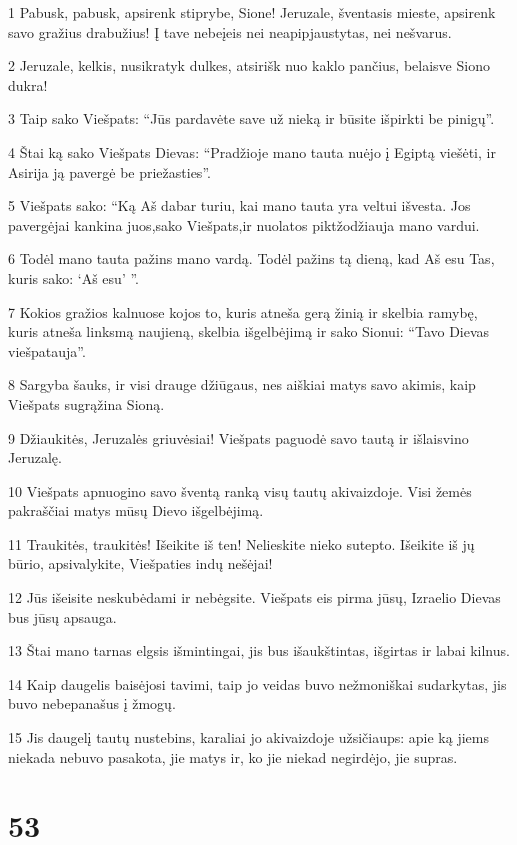 \par 1 Pabusk, pabusk, apsirenk stiprybe, Sione! Jeruzale, šventasis mieste, apsirenk savo gražius drabužius! Į tave nebeįeis nei neapipjaustytas, nei nešvarus. 
\par 2 Jeruzale, kelkis, nusikratyk dulkes, atsirišk nuo kaklo pančius, belaisve Siono dukra! 
\par 3 Taip sako Viešpats: “Jūs pardavėte save už nieką ir būsite išpirkti be pinigų”. 
\par 4 Štai ką sako Viešpats Dievas: “Pradžioje mano tauta nuėjo į Egiptą viešėti, ir Asirija ją pavergė be priežasties”. 
\par 5 Viešpats sako: “Ką Aš dabar turiu, kai mano tauta yra veltui išvesta. Jos pavergėjai kankina juos,­sako Viešpats,­ir nuolatos piktžodžiauja mano vardui. 
\par 6 Todėl mano tauta pažins mano vardą. Todėl pažins tą dieną, kad Aš esu Tas, kuris sako: ‘Aš esu’ ”. 
\par 7 Kokios gražios kalnuose kojos to, kuris atneša gerą žinią ir skelbia ramybę, kuris atneša linksmą naujieną, skelbia išgelbėjimą ir sako Sionui: “Tavo Dievas viešpatauja”. 
\par 8 Sargyba šauks, ir visi drauge džiūgaus, nes aiškiai matys savo akimis, kaip Viešpats sugrąžina Sioną. 
\par 9 Džiaukitės, Jeruzalės griuvėsiai! Viešpats paguodė savo tautą ir išlaisvino Jeruzalę. 
\par 10 Viešpats apnuogino savo šventą ranką visų tautų akivaizdoje. Visi žemės pakraščiai matys mūsų Dievo išgelbėjimą. 
\par 11 Traukitės, traukitės! Išeikite iš ten! Nelieskite nieko sutepto. Išeikite iš jų būrio, apsivalykite, Viešpaties indų nešėjai! 
\par 12 Jūs išeisite neskubėdami ir nebėgsite. Viešpats eis pirma jūsų, Izraelio Dievas bus jūsų apsauga. 
\par 13 Štai mano tarnas elgsis išmintingai, jis bus išaukštintas, išgirtas ir labai kilnus. 
\par 14 Kaip daugelis baisėjosi tavimi, taip jo veidas buvo nežmoniškai sudarkytas, jis buvo nebepanašus į žmogų. 
\par 15 Jis daugelį tautų nustebins, karaliai jo akivaizdoje užsičiaups: apie ką jiems niekada nebuvo pasakota, jie matys ir, ko jie niekad negirdėjo, jie supras.



\chapter{53}


